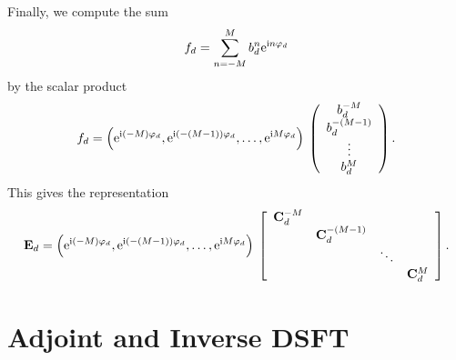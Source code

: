 Finally, we compute the sum
$$
  f_{d} = \sum_{n=-M}^M b^{n}_{d} \mbox{\rm{e}}^{\mbox{\scriptsize\rm{i}} n \varphi_{d}}
$$
by the scalar product
$$
  f_{d} 
  = 
  \left(\mbox{\rm{e}}^{\mbox{\scriptsize\rm{i}} (-M) \varphi_{d}},\mbox{\rm{e}}^{\mbox{\scriptsize\rm{i}} (-(M-1)) \varphi_{d}},\ldots,\mbox{\rm{e}}^{\mbox{\scriptsize\rm{i}} M \varphi_{d}}\right)
  \:   
  \left(\begin{array}{c}
    b^{-M}_{d}\\
    b^{-(M-1)}_{d}\\
    \vdots\\
    b^{M}_{d}
  \end{array}\right).
$$
This gives the representation
$$
  \mathbf{E}_{d} = \left(\mbox{\rm{e}}^{\mbox{\scriptsize\rm{i}} (-M) \varphi_{d}},\mbox{\rm{e}}^{\mbox{\scriptsize\rm{i}} (-(M-1)) \varphi_{d}},\ldots,\mbox{\rm{e}}^{\mbox{\scriptsize\rm{i}} M \varphi_{d}}\right) \:  
  \left[\begin{array}{cccc}
    \mathbf{C}^{-M}_{d} &                    &        &               \\
                   & \mathbf{C}^{-(M-1)}_{d} &        &               \\
                   &                    & \ddots &               \\
                   &                    &        & \mathbf{C}^{M}_{d} 
  \end{array}\right].
$$

\section{Adjoint and Inverse DSFT}

